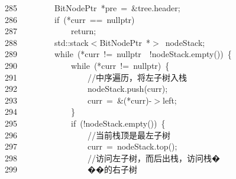 \documentclass[11pt,a4paper]{ctexart}
\newcommand{\hlstd}[1]{\textcolor[rgb]{0.2,0.2,0.2}{#1}}
\newcommand{\hlslc}[1]{\textcolor[rgb]{0.59,0.59,0.59}{#1}}
\newcommand{\hlopt}[1]{\textcolor[rgb]{0.2,0.2,0.2}{#1}}
\newcommand{\hllin}[1]{\textcolor[rgb]{0.59,0.59,0.59}{#1}}
\newcommand{\hlkwa}[1]{\textcolor[rgb]{0.23,0.42,0.78}{#1}}
\newcommand{\hlkwc}[1]{\textcolor[rgb]{0,0.63,0.31}{#1}}
\newcommand{\hlkwd}[1]{\textcolor[rgb]{0.78,0.23,0.41}{#1}}
\begin{document}
\hllin{285\ }\hlstd{}\hlstd{\ \ \ \ \ \ \ \ }\hlstd{BitNodePtr\ }\hlopt{{*}}\hlstd{pre\ }\hlopt{=\ \&}\hlstd{tree}\hlopt{.}\hlstd{header}\hlopt{;}\\
\hllin{286\ }\hlstd{}\hlstd{\ \ \ \ \ \ \ \ }\hlstd{}\hlkwa{if\ }\hlstd{}\hlopt{({*}}\hlstd{curr\ }\hlopt{==\ }\hlstd{}\hlkwc{nullptr}\hlstd{}\hlopt{)}\\
\hllin{287\ }\hlstd{}\hlstd{\ \ \ \ \ \ \ \ \ \ \ \ }\hlstd{}\hlkwa{return}\hlstd{}\hlopt{;}\\
\hllin{288\ }\hlstd{}\hlstd{\ \ \ \ \ \ \ \ }\hlstd{}\hlkwc{std}\hlstd{}\hlopt{::}\hlstd{stack}\hlopt{$<$}\hlstd{BitNodePtr\ }\hlopt{{*}$>$\ }\hlstd{nodeStack}\hlopt{;}\\
\hllin{289\ }\hlstd{}\hlstd{\ \ \ \ \ \ \ \ }\hlstd{}\hlkwa{while\ }\hlstd{}\hlopt{({*}}\hlstd{curr\ }\hlopt{!=\ }\hlstd{}\hlkwc{nullptr\ }\hlstd{}\hlopt{\textbar \textbar \ !}\hlstd{nodeStack}\hlopt{.}\hlstd{}\hlkwd{empty}\hlstd{}\hlopt{())\ \{}\\
\hllin{290\ }\hlstd{}\hlstd{\ \ \ \ \ \ \ \ \ \ \ \ }\hlstd{}\hlkwa{while\ }\hlstd{}\hlopt{({*}}\hlstd{curr\ }\hlopt{!=\ }\hlstd{}\hlkwc{nullptr}\hlstd{}\hlopt{)\ \{}\\
\hllin{291\ }\hlstd{}\hlstd{\ \ \ \ \ \ \ \ \ \ \ \ \ \ \ \ }\hlstd{}\hlslc{//中序遍历，将左子树入栈}\\
\hllin{292\ }\hlstd{}\hlstd{\ \ \ \ \ \ \ \ \ \ \ \ \ \ \ \ }\hlstd{nodeStack}\hlopt{.}\hlstd{}\hlkwd{push}\hlstd{}\hlopt{(}\hlstd{curr}\hlopt{);}\\
\hllin{293\ }\hlstd{}\hlstd{\ \ \ \ \ \ \ \ \ \ \ \ \ \ \ \ }\hlstd{curr\ }\hlopt{=\ \&({*}}\hlstd{curr}\hlopt{){-}$>$}\hlstd{left}\hlopt{;}\\
\hllin{294\ }\hlstd{}\hlstd{\ \ \ \ \ \ \ \ \ \ \ \ }\hlstd{}\hlopt{\}}\\
\hllin{295\ }\hlstd{}\hlstd{\ \ \ \ \ \ \ \ \ \ \ \ }\hlstd{}\hlkwa{if\ }\hlstd{}\hlopt{(!}\hlstd{nodeStack}\hlopt{.}\hlstd{}\hlkwd{empty}\hlstd{}\hlopt{())\ \{}\\
\hllin{296\ }\hlstd{}\hlstd{\ \ \ \ \ \ \ \ \ \ \ \ \ \ \ \ }\hlstd{}\hlslc{//当前栈顶是最左子树}\\
\hllin{297\ }\hlstd{}\hlstd{\ \ \ \ \ \ \ \ \ \ \ \ \ \ \ \ }\hlstd{curr\ }\hlopt{=\ }\hlstd{nodeStack}\hlopt{.}\hlstd{}\hlkwd{top}\hlstd{}\hlopt{();}\\
\hllin{298\ }\hlstd{}\hlstd{\ \ \ \ \ \ \ \ \ \ \ \ \ \ \ \ }\hlstd{}\hlslc{//访问左子树，而后出栈，访问栈�}\Righttorque\\
\hllin{299\ }\hlslc{}\hlstd{\ \ \ \ \ \ \ \ \ \ \ \ \ \ \ \ }\hlslc{��的右子树}\\
\end{document}
